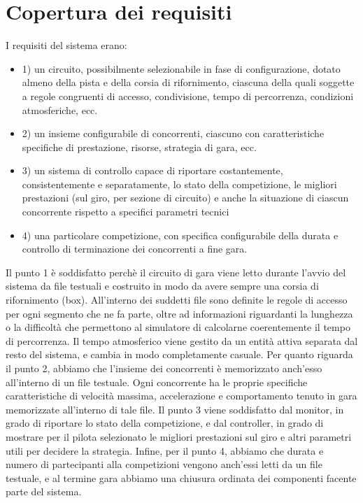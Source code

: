 
\chapter{Copertura dei requisiti} %

\label{Chapter7} %


I requisiti del sistema erano:

\begin{itemize}
 \item 1) un circuito, possibilmente selezionabile in fase di configurazione, dotato almeno della pista e della corsia di rifornimento, ciascuna della quali soggette a regole congruenti di accesso, condivisione, tempo di percorrenza, condizioni atmosferiche, ecc.
 \item 2) un insieme configurabile di concorrenti, ciascuno con caratteristiche specifiche di prestazione, risorse, strategia di gara, ecc.
 \item 3) un sistema di controllo capace di riportare costantemente, consistentemente e separatamente, lo stato della competizione, le migliori prestazioni (sul giro, per sezione di circuito) e anche la situazione di ciascun concorrente rispetto a specifici parametri tecnici
 \item 4) una particolare competizione, con specifica configurabile della durata e controllo di terminazione dei concorrenti a fine gara.
\end{itemize}

Il punto 1 è soddisfatto perchè il circuito di gara viene letto durante l’avvio del sistema da file testuali e costruito in modo da avere sempre una corsia di rifornimento (box). All’interno dei suddetti file sono definite le regole di accesso per ogni segmento che ne fa parte, oltre ad informazioni riguardanti la lunghezza o la difficoltà che permettono al simulatore di calcolarne coerentemente il tempo di percorrenza. Il tempo atmosferico viene gestito da un entità attiva separata dal resto del sistema, e cambia in modo completamente casuale.
Per quanto riguarda il punto 2, abbiamo che l’insieme dei concorrenti è memorizzato anch’esso all’interno di un file testuale. Ogni concorrente ha le proprie specifiche caratteristiche di velocità massima, accelerazione e comportamento tenuto in gara memorizzate all’interno di tale file.
Il punto 3 viene soddisfatto dal monitor, in grado di riportare lo stato della competizione, e dal controller, in grado di mostrare per il pilota selezionato le migliori prestazioni sul giro e altri parametri utili per decidere la strategia.
Infine, per il punto 4, abbiamo che durata e numero di partecipanti alla competizioni vengono anch’essi letti da un file testuale, e al termine gara abbiamo una chiusura ordinata dei componenti facente parte del sistema.